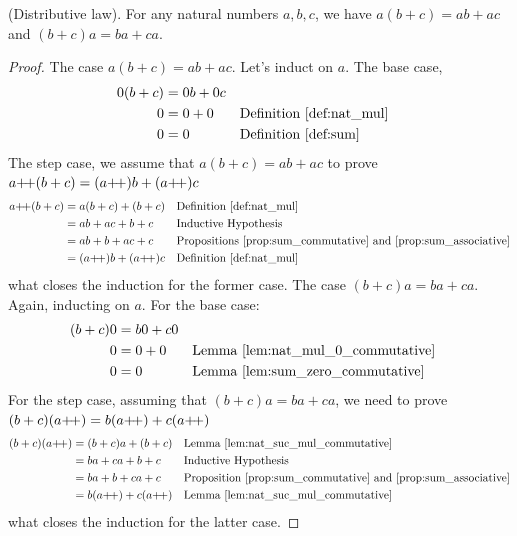 \begin{proposition}
     \textup{(Distributive law).} For any natural numbers $a, b, c$, we have $a(b + c) = ab + ac$ and $(b + c)a = ba + ca$.\label{prop:mul_distributive}
\end{proposition}

\begin{proof}
    The case $a(b + c) = ab + ac$. Let's induct on $a$. The base case,
    \begin{align*}
        0(b+c) &= 0b+0c \\
        0&=0 + 0 && \text{Definition~\ref{def:nat_mul}}\\
        0&=0 && \text{Definition~\ref{def:sum}}
    \end{align*}
    The step case, we assume that $a(b+c)=ab+ac$ to prove $a\operatorname{\!+\!+}(b+c) = (a\operatorname{\!+\!+})b + (a\operatorname{\!+\!+})c$
    \begin{align*}
        a\operatorname{\!+\!+}(b+c)&=a(b+c) + (b+c)&&\text{Definition~\ref{def:nat_mul}}\\
        &= ab+ac + b + c&& \text{Inductive Hypothesis}\\
        &= ab + b + ac + c && \text{Propositions~\ref{prop:sum_commutative} and~\ref{prop:sum_associative}}\\
        &= (a\operatorname{\!+\!+})b + (a\operatorname{\!+\!+})c && \text{Definition~\ref{def:nat_mul}}
    \end{align*}
    what closes the induction for the former case.
    The case $(b + c)a = ba + ca$. Again, inducting on $a$. For the base case:
    \begin{align*}
        (b+c)0 &= b0 +c0 \\
        0 &= 0 + 0 && \text{Lemma~\ref{lem:nat_mul_0_commutative}}\\
        0&=0 && \text{Lemma~\ref{lem:sum_zero_commutative}}
    \end{align*}
    For the step case, assuming that $(b+c)a = ba + ca$, we need to prove $(b+c)(a\operatorname{\!+\!+}) = b(a\operatorname{\!+\!+})+c(a\operatorname{\!+\!+})$
    \begin{align*}
        (b+c)(a\operatorname{\!+\!+}) &= (b+c)a+ (b+c) && \text{Lemma~\ref{lem:nat_suc_mul_commutative}}\\
        &= ba + ca + b + c && \text{Inductive Hypothesis}\\
        & = ba + b + ca + c && \text{Proposition~\ref{prop:sum_commutative} and~\ref{prop:sum_associative}}\\
        & = b(a\operatorname{\!+\!+}) + c(a\operatorname{\!+\!+}) && \text{Lemma~\ref{lem:nat_suc_mul_commutative}}
    \end{align*}
    what closes the induction for the latter case.
\end{proof}

